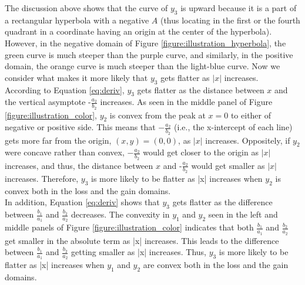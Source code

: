 \documentclass[11pt, a4paper]{article}
\begin{document}

\noindent
The discussion above shows that the curve of $y_3$ is upward because it is a part of a rectangular hyperbola with a negative $A$ (thus locating in the first or the fourth quadrant in a coordinate having an origin at the center of the hyperbola). However, in the negative domain of Figure \ref{figure:illustration_hyperbola}, the green curve is much steeper than the purple curve, and similarly, in the positive domain, the orange curve is much steeper than the light-blue curve. Now we consider what makes it more likely that $y_3$ gets flatter as $|x|$ increases.\\

\noindent
According to Equation \ref{eq:deriv}, $y_3$ gets flatter as the distance between $x$ and the vertical asymptote $\mbox{-}\frac{a_2}{b_2}$ increases. As seen in the middle panel of Figure \ref{figure:illustration_color}, $y_2$ is convex from the peak at $x=0$ to either of negative or positive side. This means that $-\frac{a_2}{b_2}$ (i.e., the x-intercept of each line) gets more far from the origin, $(x, y)=(0, 0)$, as $|x|$ increases. Oppositely, if $y_2$ were concave rather than convex, $-\frac{a_2}{b_2}$ would get closer to the origin as $|x|$ increases, and thus, the distance between $x$ and $\mbox{-}\frac{a_2}{b_2}$ would get smaller as $|x|$ increases. Therefore, $y_3$ is more likely to be flatter as |x| increases when $y_2$ is convex both in the loss and the gain domains.\\

\noindent
In addition, Equation \ref{eq:deriv} shows that $y_3$ gets flatter as the difference between $\frac{b_1}{a_1}$ and $\frac{b_2}{a_2}$ decreases.  The convexity in $y_1$ and $y_2$ seen in the left and middle panels of Figure \ref{figure:illustration_color} indicates that both $\frac{b_1}{a_1}$ and $\frac{b_2}{a_2}$ get smaller in the absolute term as |x| increases. This leads to the difference between $\frac{b_1}{a_1}$ and $\frac{b_2}{a_2}$ getting smaller as |x| increases. Thus, $y_3$ is more likely to be flatter as |x| increases when $y_1$ and $y_2$ are convex both in the loss and the gain domains.\\
\end{document}
